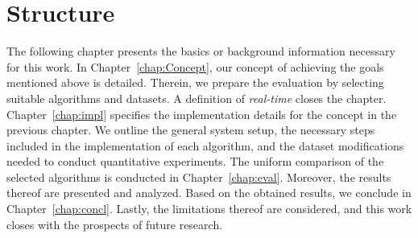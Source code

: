 \documentclass[main.tex]{subfiles}
\begin{document}
\section{Structure}
The following chapter presents the basics or background information necessary for this work.
In Chapter~\ref{chap:Concept}, our concept of achieving the goals mentioned above is detailed.
Therein, we prepare the evaluation by selecting suitable algorithms and datasets. A definition of \textit{real-time} closes the chapter.
Chapter~\ref{chap:impl} specifies the implementation details for the concept in the previous chapter. We outline the general system setup, the necessary steps included in the implementation of each algorithm, and the dataset modifications needed to conduct quantitative experiments.
The uniform comparison of the selected algorithms is conducted in Chapter~\ref{chap:eval}. Moreover, the results thereof
are presented and analyzed.
Based on the obtained results, we conclude in Chapter~\ref{chap:concl}. Lastly, the limitations thereof are
considered, and this work closes with the prospects of future research.
\end{document}
